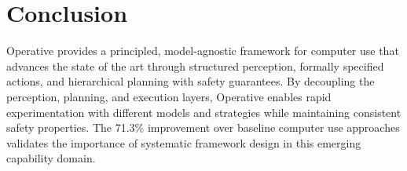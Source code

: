 \documentclass[11pt,twocolumn]{article}
\begin{document}
\section{Conclusion}
\label{sec:conclusion}

Operative provides a principled, model-agnostic framework for computer use that advances the state of the art through structured perception, formally specified actions, and hierarchical planning with safety guarantees. By decoupling the perception, planning, and execution layers, Operative enables rapid experimentation with different models and strategies while maintaining consistent safety properties. The 71.3\% improvement over baseline computer use approaches validates the importance of systematic framework design in this emerging capability domain.


\end{document}
